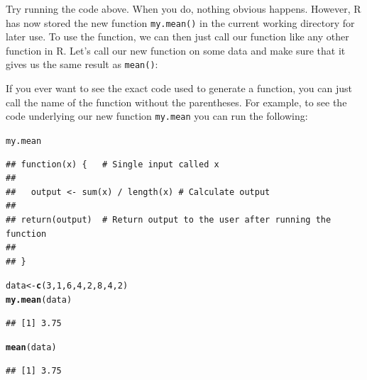 \documentclass{tufte-book}\usepackage[]{graphicx}\usepackage[]{color}
\makeatletter
\newcommand{\hlnum}[1]{\textcolor[rgb]{0.686,0.059,0.569}{#1}}%
\newcommand{\hlstd}[1]{\textcolor[rgb]{0.345,0.345,0.345}{#1}}%
\newcommand{\hlkwb}[1]{\textcolor[rgb]{0.69,0.353,0.396}{#1}}%
\newcommand{\hlkwd}[1]{\textcolor[rgb]{0.737,0.353,0.396}{\textbf{#1}}}%
\newenvironment{kframe}{%
 \def\at@end@of@kframe{}%
 \ifinner\ifhmode%
  \def\at@end@of@kframe{\end{minipage}}%
  \begin{minipage}{\columnwidth}%
 \fi\fi%
 \def\FrameCommand##1{\hskip\@totalleftmargin \hskip-\fboxsep
 \colorbox{shadecolor}{##1}\hskip-\fboxsep
     \hskip-\linewidth \hskip-\@totalleftmargin \hskip\columnwidth}%
 \MakeFramed {\advance\hsize-\width
   \@totalleftmargin\z@ \linewidth\hsize
   \@setminipage}}%
 {\par\unskip\endMakeFramed%
 \at@end@of@kframe}
\newenvironment{knitrout}{}{} %
\makeatother
\begin{document}
Try running the code above. When you do, nothing obvious happens. However, R has now stored the new function \texttt{my.mean()} in the current working directory for later use. To use the function, we can then just call our function like any other function in R. Let's call our new function on some data and make sure that it gives us the same result as \texttt{mean()}:

\begin{marginfigure}

If you ever want to see the exact code used to generate a function, you can just call the name of the function without the parentheses. For example, to see the code underlying our new function \texttt{my.mean} you can run the following:

\begin{tiny}
\begin{knitrout}
\color{fgcolor}\begin{kframe}
\begin{alltt}
\hlstd{my.mean}
\end{alltt}
\begin{verbatim}
## function(x) {   # Single input called x
## 
##   output <- sum(x) / length(x) # Calculate output
## 
## return(output)  # Return output to the user after running the function
## 
## }
\end{verbatim}
\end{kframe}
\end{knitrout}
\end{tiny}

\end{marginfigure}


\begin{knitrout}
\color{fgcolor}\begin{kframe}
\begin{alltt}
\hlstd{data} \hlkwb{<-} \hlkwd{c}\hlstd{(}\hlnum{3}\hlstd{,} \hlnum{1}\hlstd{,} \hlnum{6}\hlstd{,} \hlnum{4}\hlstd{,} \hlnum{2}\hlstd{,} \hlnum{8}\hlstd{,} \hlnum{4}\hlstd{,} \hlnum{2}\hlstd{)}
\hlkwd{my.mean}\hlstd{(data)}
\end{alltt}
\begin{verbatim}
## [1] 3.75
\end{verbatim}
\begin{alltt}
\hlkwd{mean}\hlstd{(data)}
\end{alltt}
\begin{verbatim}
## [1] 3.75
\end{verbatim}
\end{kframe}
\end{knitrout}
\end{document}
